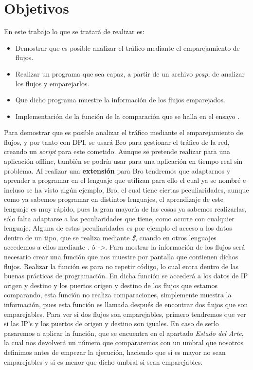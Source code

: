 \chapter{Objetivos}
En este trabajo lo que se tratará de realizar es:
\begin{itemize}
\item Demostrar que es posible analizar el tráfico mediante el emparejamiento de flujos.
\item Realizar un programa que sea capaz, a partir de un archivo \textit{pcap}, de analizar los flujos y emparejarlos.
\item Que dicho programa muestre la información de los flujos emparejados.
\item Implementación de la función de la comparación que se halla en el ensayo \cite{comparacion}.
\end{itemize}

\noindent Para demostrar que es posible analizar el tráfico mediante el emparejamiento 
de flujos, y por tanto con DPI, se usará Bro para gestionar el tráfico de 
la red, creando un \textit{script} para este cometido. Aunque se pretende 
realizar para una aplicación offline, también se podría usar para una 
aplicación en tiempo real sin problema.
\intro
Al realizar una \textbf{extensión} para Bro tendremos que adaptarnos y aprender a 
programar en el lenguaje que utilizan para ello el cual ya se nombré e incluso se ha visto algún ejemplo, 
Bro, el cual tiene ciertas peculiaridades, aunque como ya sabemos 
programar en distintos lenguajes, el 
aprendizaje de este lenguaje es muy rápido, pues la gran mayoría de las cosas 
ya sabemos realizarlas, sólo falta adaptarse a las peculiaridades que tiene, como ocurre con 
cualquier lenguaje. Alguna de estas peculiaridades es por ejemplo el acceso a 
los datos dentro de un tipo, que se realiza mediante \textit{\$}, cuando en otros 
lenguajes accedemos a ellos mediante \textit{.} ó \textit{->}.
\intro
Para mostrar la información de los flujos será necesario crear una función 
que nos muestre por pantalla que contienen dichos flujos. Realizar la función 
es para no repetir código, lo cual entra dentro de las buenas prácticas de 
programación. En dicha función se accederá a los datos de IP origen y 
destino y los puertos origen y destino de los flujos que estamos comparando, 
esta función no realiza comparaciones, simplemente muestra la información, 
pues esta función es llamada después de encontrar dos flujos que son emparejables.
\intro
Para ver si dos flujos son emparejables, primero tendremos que ver si las IP’s 
y los puertos de origen y destino son iguales. En caso de serlo pasaremos a 
aplicar la función, que se encuentra en el apartado \textit{Estado del Arte}, la cual nos devolverá 
un número que compararemos con un umbral que nosotros definimos antes de empezar la ejecución, haciendo que 
si es mayor no sean emparejables y si es menor que dicho umbral si sean emparejables.